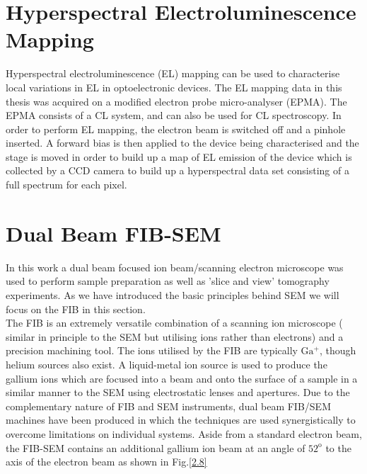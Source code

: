 \section{Hyperspectral Electroluminescence Mapping}
Hyperspectral electroluminescence   (EL) mapping can be used to characterise local variations in EL in optoelectronic devices. The EL mapping data in this thesis was acquired on a modified electron probe micro-analyser  (EPMA). The EPMA consists of a CL system, and can also be used for CL spectroscopy. In order to perform EL mapping, the electron beam is switched off and a pinhole inserted. A forward bias is then applied to the device being characterised and the stage is moved in order to build up a map of EL emission of the device which is collected by a CCD camera to build up a hyperspectral data set consisting of a full spectrum for each pixel.


\section{Dual Beam FIB-SEM}

In this work a dual beam focused ion beam/scanning electron microscope   was used to perform sample preparation as well as 'slice and view' tomography experiments. As we have introduced the basic principles behind SEM we will focus on the FIB in this section.
\\ The FIB is an extremely versatile combination of a scanning ion microscope ( similar in principle to the SEM but utilising ions rather than electrons) and a precision machining tool. The ions utilised by the FIB are typically $\mathrm{Ga^{+}}$, though helium sources also exist. A liquid-metal ion source is used to produce the gallium ions which are focused into a beam and onto the surface of a sample in a similar manner to the SEM using electrostatic lenses and apertures. Due to the complementary nature of FIB and SEM instruments, dual beam FIB/SEM machines have been produced in which the techniques are used synergistically to overcome limitations on individual systems. Aside from a standard electron beam, the FIB-SEM contains an additional gallium ion beam at an angle of $\mathrm{52^{o}}$ to the axis of the electron beam as shown in Fig.\ref{2.8}

